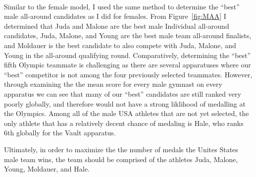 \documentclass[12pt]{article}
\begin{document}
\\

Similar to the female model, I used the same method to determine the ``best'' male all-around candidates as I did for females. From 
Figure~\ref{fig:MAA} I determined that Juda and Malone are the best male Individual all-around candidates, 
Juda, Malone, and Young are the best male team all-around finalists, and Moldauer is the best candidate to also compete 
with Juda, Malone, and Young in the all-around qualifying round. Comparatively, determining the ``best'' fifth Olympic 
teammate is challenging as there are several apparatuses where our ``best'' competitor is not among the four 
previously selected teammates. However, through examining the the mean score for every male gymnast on every apparatus 
we can see that many of our ``best'' candidates are still ranked very poorly globally, and therefore would not have a 
strong liklihood of medalling at the Olympics. Among all of the male USA athletes that are not yet selected, the only 
athlete that has a relatively decent chance of medaling is Hale, who ranks 6th globally for the Vault apparatus.

Ultimately, in order to maximize the the number of medals the Unites States male team wins, the team should be comprised  
of the athletes Juda, Malone, Young, Moldauer, and Hale.



\end{document}
